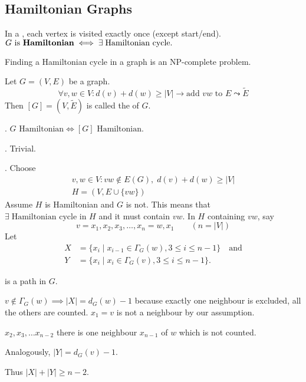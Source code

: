 
\subsection*{Hamiltonian Graphs}

\begin{definition}
In a , each vertex is visited exactly once (except start/end).
$\text{$G$ is \textbf{Hamiltonian}} \iff \exists\;\text{Hamiltonian cycle}.$
\end{definition}

Finding a Hamiltonian cycle in a graph is an NP-complete problem.

\begin{definition}
Let $G=(V,E)$ be a graph.
\[
\forall v,w\in V : d(v)+d(w) ≥ |V| \rightarrow\text{add $vw$ to $E$}\leadsto \tilde E
\]
Then $[G] = (V,\tilde E)$ is called the  of $G$.
\end{definition}

\Theorem.  $G\text{ Hamiltonian} \iff [G]\text{ Hamiltonian}.$

\ProofForward.
Trivial.

\ProofBackward.
Choose
\begin{gather*}
  v,w\in V: vw \not\in E(G),\;d(v)+d(w) ≥ |V| \\
  H=(V,E\cup \{vw\})
\end{gather*}
Assume $H$ is Hamiltonian and $G$ is not.
This means that $\exists\;\text{Hamiltonian cycle in $H$}$ and it must contain $vw$.
In $H$ containing $vw$, say
\[ v=x_1,x_2,x_3,\ldots,x_n=w,x_1 \qquad(n=|V|)\]
Let
\begin{align*}
    X &=\{x_i \mid x_{i-1}\in \Gamma_G(w), 3 ≤ i ≤ n-1 \}\quad\text{and} \\
    Y &=\{x_i \mid x_i\in \Gamma_G(v), 3 ≤ i ≤ n-1 \}.
\end{align*}

 is a path in $G$.

$v \not\in \Gamma_G(w) \implies |X| = d_G(w) - 1$
because exactly one neighbour is excluded, all the others are counted. $x_1= v$ is not a neighbour by our assumption.

$x_2, x_3, \ldots x_{n-2}$ there is one neighbour $x_{n-1}$ of $w$ which is not counted. 

Analogously,
$|Y| = d_G(v) - 1$.

Thus $|X| + |Y| \geq n-2$.


